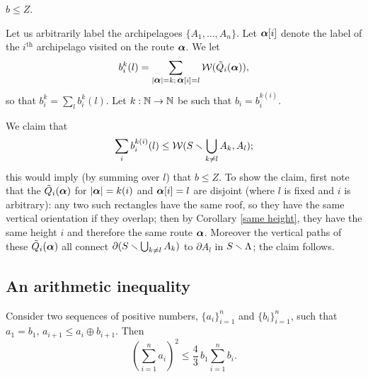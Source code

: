 \begin{lem}\label{b-estimate}
    $  b  \leq Z. $ 
\end{lem}
%
\begin{pf}
  Let us arbitrarily label the archipelagoes $\{A_1, \ldots, A_n\}$.
  Let ${\mbox{\boldmath$\alpha$} }[i]$ denote the label of the $i^{\text{th}}$ archipelago 
  visited on the route ${\mbox{\boldmath$\alpha$} }$.
  We let 
$$
b_i^k(l) = \sum_{|{\mbox{\small\boldmath$\alpha$} }| = k;\, {\mbox{\small\boldmath$\alpha$} }[i] = l} {\cal W}(\tilde Q_i({\mbox{\boldmath$\alpha$} })),
$$
so that $b_i^k = \sum_l b_i^k(l)$.
Let $k : {\Bbb N} \to {\Bbb N}$ be such that $b_i = b_i^{k(i)}$.

We claim that 
$$
\sum_i b_i^{k(i)}(l) \le {\cal W}(S \smallsetminus \bigcup_{k\neq l} A_k, A_l);
$$
this would imply (by summing over $l$) that $b \le Z$.
To show the claim, 
first note that the $\tilde Q_i({\mbox{\boldmath$\alpha$} })$ for $|{\mbox{\boldmath$\alpha$} }| = k(i)$ and ${\mbox{\boldmath$\alpha$} }[i] = l$
are disjoint (where $l$ is fixed and $i$ is arbitrary):
any two such rectangles have the same roof,
so they have the same vertical orientation if they overlap; 
then by Corollary \ref{same height}, 
they have the same height $i$ and therefore the same route ${\mbox{\boldmath$\alpha$} }$.
Moreover the vertical paths of these $\tilde Q_i({\mbox{\boldmath$\alpha$} })$ all connect 
$\partial(S \smallsetminus \bigcup_{k\neq l} A_k)$ to $\partial A_l$ in $S \smallsetminus \Lambda$;
the claim follows.
\end{pf}


\subsection{An arithmetic inequality}\label{arithmetic sec}
 
% 
 
\begin{lem}\label{harmonic sums} 
   Consider two sequences of positive numbers, $\{a_i\}_{i=1}^n$ and $\{b_i\}_{i=1}^n$,
 such that $a_1= b_1$, $a_{i+1}\leq  a_i\oplus b_{i+1}$. Then
\begin{equation}\label{inequality}
         \left(\sum_{i=1}^n  a_i\right)^2 \leq \frac{4}{3} \, b_1 \sum_{i=1}^n b_i. 
\end{equation}
\end{lem}
         
